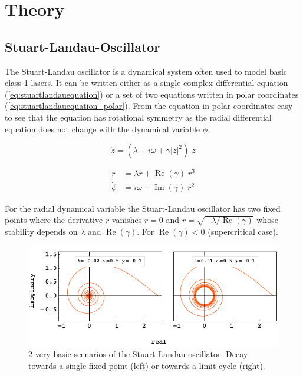 \section{Theory}

	\subsection{Stuart-Landau-Oscillator}
	The Stuart-Landau oscillator is a dynamical system often used to model basic class 1 lasers. It can be written either as a single complex differential equation (\ref{eq:stuartlandauequation}) or a set of two equations written in polar coordinates (\ref{eq:stuartlandauequation_polar}). From the equation in polar coordinates easy to see that the equation has rotational symmetry as the radial differential equation does not change with the dynamical variable $\phi$.
	
	\begin{equation}	
		\dot{z} = (\lambda +  i \omega + \gamma |z|^2 ) \; z
		\label{eq:stuartlandauequation}		
	\end{equation}
	
	\begin{equation}
		\begin{split}
		\dot{r} & = \lambda r + \operatorname{Re} (\gamma) \; r^{3} \\
		\dot{\phi} &= i \omega + \operatorname{Im}(\gamma) \; r^{2} 
		\end{split}
		\label{eq:stuartlandauequation_polar}
	\end{equation}

	For the radial dynamical variable the Stuart-Landau oscillator has two fixed points where the derivative $\dot{r}$ vanishes $r = 0$ and $r = \sqrt{-\lambda /\operatorname{Re}(\gamma)}$ whose stability depends on $\lambda$ and $\operatorname{Re}(\gamma)$. For $\operatorname{Re}(\gamma) < 0 $ (supercritical case).
	

	\begin{figure}
		\centering
		\includegraphics[width=0.99\linewidth]{pics/stuart_landau_complex_Focus_LC}
		\caption{$2$ very basic scenarios of the Stuart-Landau oscillator: Decay towards a single fixed point (left) or towards a limit cycle (right).}
		\label{fig:stuart_spiral}
	\end{figure}




